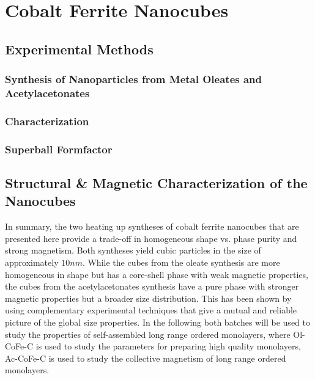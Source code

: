 \documentclass[\main/dresen_thesis.tex]{subfiles}
\renewcommand{\thisPath}{\main/chapters/monolayers/nanoparticles/}
\begin{document}
  \section{Cobalt Ferrite Nanocubes}
    

    \subsection{Experimental Methods}
      \subsubsection{Synthesis of  Nanoparticles from Metal Oleates and Acetylacetonates}
        
          \FloatBarrier
      \subsubsection{Characterization}
        
          \FloatBarrier
      \subsubsection{Superball Formfactor}
        
          \FloatBarrier

    \subsection{Structural \& Magnetic Characterization of the Nanocubes}
      
        \FloatBarrier

  In summary, the two heating up syntheses of cobalt ferrite nanocubes that are presented here provide a trade-off in homogeneous shape vs. phase purity and strong magnetism.
  Both syntheses yield cubic particles in the size of approximately $10 \unit{nm}$.
  While the cubes from the oleate synthesis are more homogeneous in shape but has a core-shell phase with weak magnetic properties, the cubes from the acetylacetonates synthesis have a pure phase with stronger magnetic properties but a broader size distribution.
  This has been shown by using complementary experimental techniques that give a mutual and reliable picture of the global size properties.
  In the following both batches will be used to study the properties of self-assembled long range ordered monolayers, where Ol-CoFe-C is used to study the parameters for preparing high quality monolayers, Ac-CoFe-C is used to study the collective magnetism of long range ordered monolayers.
\end{document}
